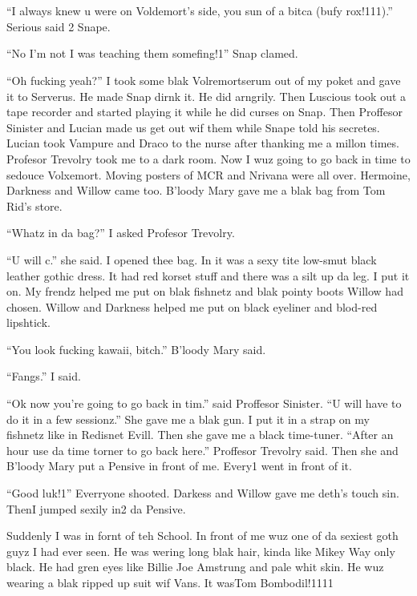 \section{}



\enquote{I always knew u were on Voldemort's side, you sun of a bitca (bufy rox!111).} Serious said 2 Snape.

\enquote{No I'm not I was teaching them somefing!1} Snap clamed.

\enquote{Oh fucking yeah?} I took some blak Volremortserum out of my poket and gave it to Serverus. He made Snap dirnk it. He did arngrily. Then Luscious took out a tape recorder and started playing it while he did curses on Snap. Then Proffesor Sinister and Lucian made us get out wif them while Snape told his secretes. Lucian took Vampure and Draco to the nurse after thanking me a millon times. Profesor Trevolry took me to a dark room. Now I wuz going to go back in time to sedouce Volxemort. Moving posters of MCR and Nrivana were all over. Hermoine, Darkness and Willow came too. B'loody Mary gave me a blak bag from Tom Rid's store.

\enquote{Whatz in da bag?} I asked Profesor Trevolry.

\enquote{U will c.} she said. I opened thee bag. In it was a sexy tite low-smut black leather gothic dress. It had red korset stuff and there was a silt up da leg. I put it on. My frendz helped me put on blak fishnetz and blak pointy boots Willow had chosen. Willow and Darkness helped me put on black eyeliner and blod-red lipshtick.

\enquote{You look fucking kawaii, bitch.} B'loody Mary said.

\enquote{Fangs.} I said.

\enquote{Ok now you're going to go back in tim.} said Proffesor Sinister. \enquote{U will have to do it in a few sessionz.} She gave me a blak gun. I put it in a strap on my fishnetz like in Redisnet Evill. Then she gave me a black time-tuner. \enquote{After an hour use da time torner to go back here.} Proffesor Trevolry said. Then she and B'loody Mary put a Pensive in front of me. Every1 went in front of it.

\enquote{Good luk!1} Everryone shooted. Darkess and Willow gave me deth's touch sin. Then\dotfill I jumped sexily in2 da Pensive.

Suddenly I was in fornt of teh School. In front of me wuz one of da sexiest goth guyz I had ever seen. He was wering long blak hair, kinda like Mikey Way only black. He had gren eyes like Billie Joe Amstrung and pale whit skin. He wuz wearing a blak ripped up suit wif Vans. It was\dotfill Tom Bombodil!1111
